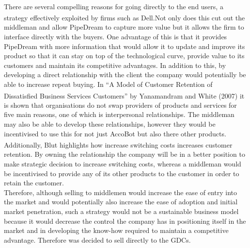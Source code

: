 \documentclass[11pt]{article}		%
\newcommand{\supercite}[1]{\textsuperscript{\cite{#1}}}		%
\begin{document}
\\ \hspace*{3ex}
There are several compelling reasons for going directly to the end users, a strategy effectively exploited by firms such as Dell.\supercite{business_model}Not only does this cut out the middleman and allow PipeDream to capture more value but it allows the firm to interface directly with the buyers. One advantage of this is that it provides PipeDream with more information that would allow it to update and improve its product so that it can stay on top of the technological curve, provide value to its customers and maintain its competitive advantages. In addition to this, by developing a direct relationship with the client the company would potentially be able to increase repeat buying. In “A Model of Customer Retention of Dissatisfied Business Services Customers” by Yanamandram and White (2007)\supercite{customers} it is shown that organisations do not swap providers of products and services for five main reasons, one of which is interpersonal relationships. The middleman may also be able to develop these relationships, however they would be incentivised to use this for not just AccoBot but also there other products. Additionally, Blut\supercite{B2Brelations} highlights how increase switching costs increases customer retention. By owning the relationship the company will be in a better position to make strategic decision to increase switching costs, whereas a middleman would be incentivised to provide any of its other products to the customer in order to retain the customer. 
\\ \hspace*{3ex}
Therefore, although selling to middlemen would increase the ease of entry into the market and would potentially also increase the ease of adoption and initial market penetration, such a strategy would not be a sustainable business model because it would decrease the control the company has in positioning itself in the market and in developing the know-how required to maintain a competitive advantage. Therefore was decided to sell directly to the GDCs.
\end{document}
